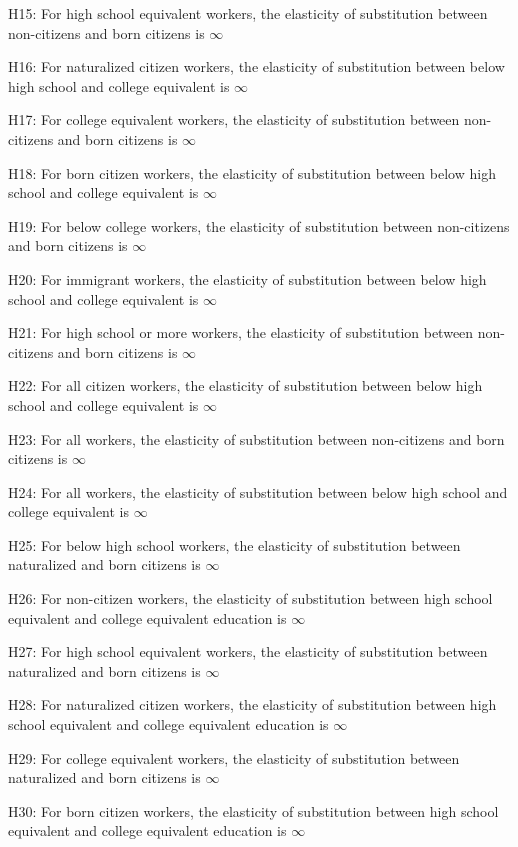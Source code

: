 \documentclass[11pt]{article}
\theoremstyle{definition}
\theoremstyle{remark}
\begin{document}
{H15: For high school equivalent workers, the elasticity of substitution between non-citizens and born citizens is $\infty$

H16: For naturalized citizen workers, the elasticity of substitution between below high school and college equivalent is $\infty$

H17: For college equivalent workers, the elasticity of substitution between non-citizens and born citizens is $\infty$

H18: For born citizen workers, the elasticity of substitution between below high school and college equivalent is $\infty$

H19: For below college workers, the elasticity of substitution between non-citizens and born citizens is $\infty$

H20: For immigrant workers, the elasticity of substitution between below high school and college equivalent is $\infty$

H21: For high school or more workers, the elasticity of substitution between non-citizens and born citizens is $\infty$

H22: For all citizen workers, the elasticity of substitution between below high school and college equivalent is $\infty$

H23: For all workers, the elasticity of substitution between non-citizens and born citizens is $\infty$

H24: For all workers, the elasticity of substitution between below high school and college equivalent is $\infty$

H25: For below high school workers, the elasticity of substitution between naturalized and born citizens is $\infty$

H26: For non-citizen workers, the elasticity of substitution between high school equivalent and college equivalent education is $\infty$

H27: For high school equivalent workers, the elasticity of substitution between naturalized and born citizens is $\infty$

H28: For naturalized citizen workers, the elasticity of substitution between high school equivalent and college equivalent education is $\infty$

H29: For college equivalent workers, the elasticity of substitution between naturalized and born citizens is $\infty$

H30: For born citizen workers, the elasticity of substitution between high school equivalent and college equivalent education is $\infty$

}
\end{document}
